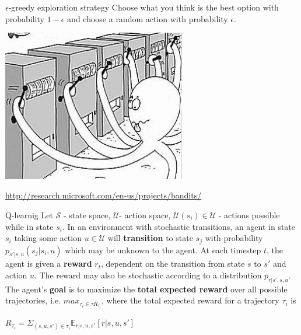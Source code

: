 \documentclass{beamer}
\begin{document}
\begin{frame}{$\epsilon$-greedy exploration strategy}
  Choose what you think is the best option with probability $1-\epsilon$ and choose a random action with probability $\epsilon$.

  \begin{center}
  \includegraphics[width=0.6\textwidth]{exploration.jpg}
  \end{center}

  \begin{center}
  \begin{tiny}
  \url{http://research.microsoft.com/en-us/projects/bandits/}  
  \end{tiny}
  \end{center}
\end{frame}


\begin{frame}{Q-learnig}
  Let $\mathcal{S}$ - state space, $\mathcal{U}$- action space, $\mathcal{U}(s_i) \in \mathcal{U}$ - actions possible while in state $s_i$.
  \vskip0.1in
  In an environment with stochastic transitions, an agent in state $s_i$ taking some action $u \in \mathcal{U}$ will \textbf{transition} to state $s_j$ with probability $p_{s'|s, u}(s_j | s_i, u)$ which may be unknown to the agent.
  \vskip0.1in
  At each timestep $t$, the agent is given a \textbf{reward} $r_t$, dependent on the transition from state $s$ to $s'$ and action $u$. The reward may also be stochastic according to a distribution $p_{r|s', s, u}$.
  \vskip0.1in
  The agent's \textbf{goal} is to maximize the \textbf{total expected reward} over all possible trajectories, i.e. $max_{\tau_i \in \tau R_{\tau_i}}$, where the total expected reward for a trajectory $\tau_i$ is

  \begin{center}
  $R_{\tau_i} = \Sigma_{(s, u, s') \in \tau_i} \mathds{E}_{r|s, u, s'}[r|s, u, s']$
  \end{center}
\end{frame}
\end{document}
